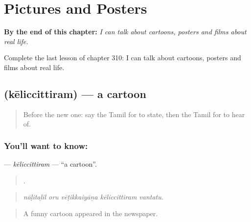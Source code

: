 
\chapter{Pictures and Posters}
\label{ch:ta-pictures-and-posters}

\begin{chapteropening}
\textbf{By the end of this chapter:} \emph{I can talk about cartoons, posters and films about real life.}

Complete the last lesson of chapter 310: I can talk about cartoons, posters and films about real life.
\end{chapteropening}

\section[\texorpdfstring{\ta{கேலிச்சித்திரம்} (kēliccittiram)}{கேலிச்சித்திரம் (kēliccittiram)}]{ (kēliccittiram) — a cartoon}

\label{lesson:TA-C310-keliccittiram}



\begin{quote}
Before the new one: say the Tamil for to state, then the Tamil for to hear of.
\end{quote}

\subsection*{You'll want to know: }
\textbf{} — \emph{kēliccittiram} — \textquotedblleft{}a cartoon\textquotedblright{}.

\begin{quote}
    .
\end{quote}

\begin{quote}
\emph{nāḷitaḻil oru vēṭikkaiyāṉa kēliccittiram vantatu.}
\end{quote}

\begin{quote}
A funny cartoon appeared in the newspaper.
\end{quote}

